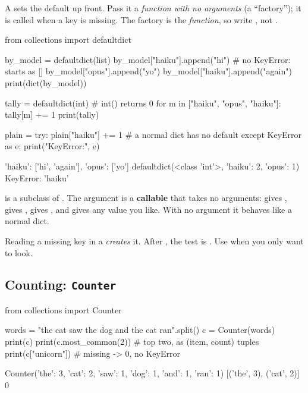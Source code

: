 A  sets the default up front. Pass it a \emph{function with no arguments}
(a ``factory''); it is called when a key is missing. The factory is the \emph{function}, so
write , not .

\begin{pycode}
from collections import defaultdict

by_model = defaultdict(list)
by_model["haiku"].append("hi")        # no KeyError: starts as []
by_model["opus"].append("yo")
by_model["haiku"].append("again")
print(dict(by_model))

tally = defaultdict(int)              # int() returns 0
for m in ["haiku", "opus", "haiku"]:
    tally[m] += 1
print(tally)

plain = {}
try:
    plain["haiku"] += 1               # a normal dict has no default
except KeyError as e:
    print("KeyError:", e)
\end{pycode}
\begin{rawcode}
{'haiku': ['hi', 'again'], 'opus': ['yo']}
defaultdict(<class 'int'>, {'haiku': 2, 'opus': 1})
KeyError: 'haiku'
\end{rawcode}

\begin{typecheck}
 is a subclass of . The argument is a \textbf{callable} that takes no
arguments:  gives ,  gives \code{[]},  gives \code{\{\}}, and
 gives any value you like. With no argument it behaves like a normal dict.
\end{typecheck}

\begin{trap}
Reading a missing key in a  \emph{creates} it. After
, the test  is . Use  when you only want to look.
\end{trap}

\subsection{Counting: \texttt{Counter}}

\begin{pycode}
from collections import Counter

words = "the cat saw the dog and the cat ran".split()
c = Counter(words)
print(c)
print(c.most_common(2))     # top two, as (item, count) tuples
print(c["unicorn"])         # missing -> 0, no KeyError
\end{pycode}
\begin{rawcode}
Counter({'the': 3, 'cat': 2, 'saw': 1, 'dog': 1, 'and': 1, 'ran': 1})
[('the', 3), ('cat', 2)]
0
\end{rawcode}

